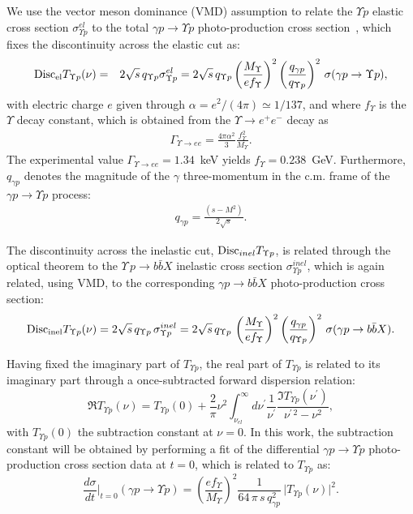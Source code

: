 \documentclass[10pt,prd,aps,nofootinbib,superscriptaddress]{revtex4}
\newcommand{\beq}{\begin{equation}}
\newcommand{\eeq}{\end{equation}}
\newcommand{\bea}{\begin{eqnarray}}
\newcommand{\eea}{\end{eqnarray}}
\begin{document}
We use the vector meson dominance (VMD) assumption to relate the $\Upsilon p$ elastic cross section 
$\sigma_{\Upsilon p}^{el}$ to the total $\gamma p \to \Upsilon p$ photo-production cross section~\cite{Barger:1975ng,Redlich:2000cb}, which fixes the 
discontinuity across the elastic cut as: 
\bea
{\rm Disc}_{\rm el} T_{\Upsilon p}(\nu)  &=& 2 \sqrt{s} \, q_{\Upsilon p} \sigma_{\Upsilon p}^{el} 
=  2 \sqrt{s} \, q_{\Upsilon p}  \left( \frac{M_\Upsilon}{e f_\Upsilon} \right)^2 \left( \frac{q_{\gamma p}}{q_{\Upsilon p}} \right)^2 \, 
\sigma (\gamma p \to \Upsilon p), 
\label{eq:sigmael}
\eea
with electric charge $e$ given through $\alpha = e^2 / (4 \pi) \simeq 1/137$, and  where $f_\Upsilon$ is the $\Upsilon$ decay constant, which is obtained from the $\Upsilon \to e^+ e^-$ decay as 
\begin{eqnarray}
\Gamma_{\Upsilon \to ee} = \frac{4 \pi \alpha^2}{3} \frac{f_\Upsilon^2}{M_\Upsilon}.
\end{eqnarray}
The experimental value $\Gamma_{\Upsilon \to ee} =  1.34$~keV yields $f_\Upsilon = 0.238$~GeV. Furthermore, $q_{\gamma p}$ denotes the magnitude of the 
$\gamma$ three-momentum in the c.m. frame of the $\gamma p \to \Upsilon p$ process:
\bea
q_{\gamma p} = \frac{(s - M^2)}{2 \sqrt{s}}.
\eea

The discontinuity across the inelastic cut, ${\rm Disc}_{inel} T_{\Upsilon p}$, 
is related through the optical theorem to the $\Upsilon \, p \to b \bar b X$ inelastic cross section 
$\sigma_{\Upsilon p}^{inel}$, which is again related, using VMD, to the corresponding $\gamma p \to b \bar b X$ photo-production cross section:
\bea
{\rm Disc}_{\rm inel} T_{\Upsilon p}(\nu) = 2 \sqrt{s} \, q_{\Upsilon p} \, \sigma_{\Upsilon p}^{inel}    
 = 2 \sqrt{s} \, q_{\Upsilon p} \,  \left( \frac{M_\Upsilon}{e f_\Upsilon} \right)^2  \left( \frac{q_{\gamma p}}{q_{\Upsilon p}} \right)^2 \,  \sigma (\gamma p \to b \bar b X). 
\label{eq:sigmainel}
\eea

Having fixed the imaginary part of $T_{\Upsilon p}$,  
the real part of $T_{\Upsilon p}$ is related to its imaginary part
through a once-subtracted forward dispersion relation:
\beq
\Re T_{\Upsilon p}(\nu) = T_{\Upsilon p}(0) + \frac{2}{\pi} \nu^2 \int_{\nu_{el}}^\infty d
\nu^\prime \frac{1}{\nu^\prime} \frac{\Im T_{\Upsilon p}(\nu^\prime)}{\nu^{\prime \, 2} - \nu^2},
\label{eq:disp}
\eeq
with $T_{\Upsilon p}(0) $ the subtraction constant at $\nu = 0$. In this work, the subtraction constant will be obtained by performing a fit of the 
differential $\gamma p \to \Upsilon p$  photo-production cross section data at $t=0$, which is related to $T_{\Upsilon p}$ as:
\beq
\frac{d \sigma}{dt} \biggr|_{t = 0} (\gamma p \to \Upsilon p) 
= \left( \frac{e f_\Upsilon}{M_\Upsilon} \right)^2  \frac{1}{64 \, \pi \, s \, q_{\gamma p}^2} \, \big| T_{\Upsilon p}(\nu) \big|^2.
\label{eq:dsigmadt0_gapjpsip}
\eeq
\end{document}

